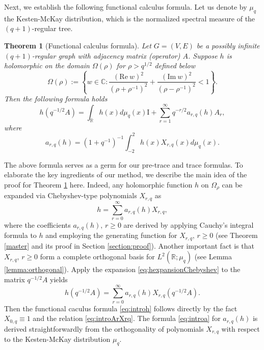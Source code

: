 \documentclass{article}
\newtheorem{introtheorem}{Theorem}
\begin{document}
Next, we establish the following functional calculus formula.
Let us denote by $\mu_q$ the Kesten-McKay distribution, which is the normalized spectral measure of the $(q+1)$-regular tree. 
\begin{introtheorem}[Functional calculus formula]\label{introexpansion}
    Let $G=(V,E)$ be a possibly infinite $(q+1)$-regular graph with adjacency matrix (operator) $A$.
    Suppose $h$ is holomorphic on the domain $\Omega(\rho)$ for $\rho>q^{1/2}$ defined below
       $$\Omega(\rho):=\left\{w\in \mathbb{C}:\frac{(\mathrm{Re}\ w)^2}{(\rho+\rho^{-1})^2}+\frac{(\mathrm{Im}\ w)^2}{(\rho-\rho^{-1})^2}<1\right\}.$$
    Then the following formula holds
    \begin{equation}\label{eq:introh}
        h(q^{-1/2}A)=\int_{\mathbb{R}} h(x)d\mu_q(x)\mathrm{I}+\sum_{r=1}^{\infty}q^{-r/2}a_{r,q}(h) A_r,
    \end{equation}
    where 
    \begin{equation}\label{eq:introa}
        a_{r,q}(h)=(1+q^{-1})^{-1}\int_{-2}^{2}h(x)X_{r,q}(x)d\mu_q(x).
    \end{equation}
\end{introtheorem}
The above formula serves as a germ for our pre-trace and trace formulas. To elaborate the key ingredients of our method, we describe the main idea of the proof for Theorem \ref{introexpansion} here.
Indeed, any holomorphic function $h$ on $\Omega_\rho$ can be expanded via Chebyshev-type polynomials $X_{r,q}$ as
\begin{equation}\label{eq:hexpansionChebyshev}
    h=\sum_{r=0}^\infty a_{r,q}(h)X_{r,q},
\end{equation}
where the coefficients $a_{r,q}(h),\,r\geq 0$ are derived by applying Cauchy's integral formula to $h$ and employing the generating function for $X_{r,q},\,r\geq 0$ (see Theorem \ref{master} and its proof in Section \ref{section:proof}). Another important fact is that $X_{r,q},\,r\geq 0$ form a complete orthogonal basis for $L^2(\mathbb{R};\mu_q)$ (see Lemma \ref{lemma:orthogonal}). Apply the expansion \eqref{eq:hexpansionChebyshev} to the matrix $q^{-1/2}A$ yields 
\begin{equation*}
    h(q^{-1/2}A)=\sum_{r=0}^\infty a_{r,q}(h)X_{r,q}(q^{-1/2}A).
\end{equation*}
Then the functional caculus formula \eqref{eq:introh} follows directly by the fact $X_{0,q}\equiv 1$ and the relation \eqref{eq:introArXrq}. The formula \eqref{eq:introa} for $a_{r,q}(h)$ is derived straightforwardly from the orthogonality of polynomials $X_{r,q}$ with respect to the Kesten-McKay distribution $\mu_q$.
\end{document}
